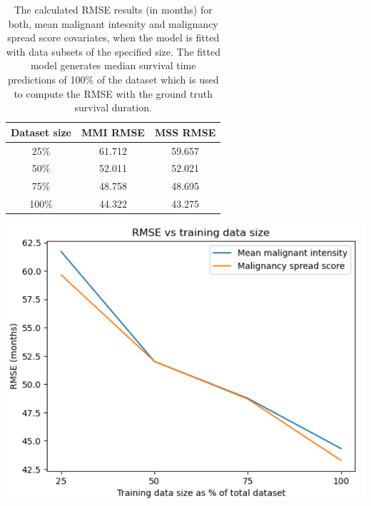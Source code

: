 \documentclass{l4proj}
\begin{document}
\begin{table}[ht]
\hspace{-1cm}
\begin{minipage}[b]{0.56\linewidth}
\centering
\begin{tabular}{c|c|c}
    \hline
         Dataset size & MMI RMSE & MSS RMSE  \\ \hline
         25\% & 61.712 & 59.657\\
         50\% & 52.011 & 52.021\\
         75\% & 48.758 & 48.695\\
         100\% & 44.322 & 43.275\\
    \end{tabular}
    \vspace{2cm}
    \caption{The calculated RMSE results (in months) for both, mean malignant intesnity and malignancy spread score covariates, when the model is fitted with data subsets of the specified size. The fitted model generates median survival time predictions of 100\% of the dataset which is used to compute the RMSE with the ground truth survival duration.}
    \label{tab:datset-size-effect}
\end{minipage}\hfill
\hspace{-2cm}
\begin{minipage}[b]{0.4\linewidth}
\centering
    \includegraphics[scale=0.3]{images/data-size-RMSE.png}
    \label{fig:data-size-RMSE}
\end{minipage}
\end{table}
\end{document}
